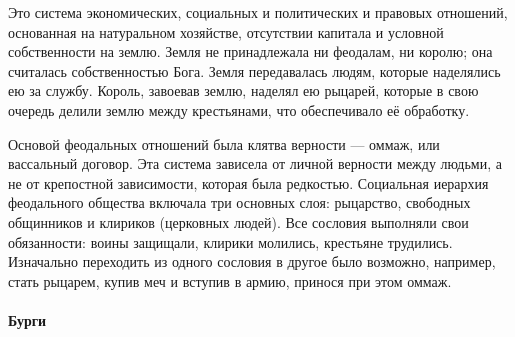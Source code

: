 Это система экономических, социальных и политических и правовых отношений, основанная на натуральном хозяйстве, отсутствии капитала и условной собственности на землю. Земля не принадлежала ни феодалам, ни королю; она считалась собственностью Бога. Земля передавалась людям, которые наделялись ею за службу. Король, завоевав землю, наделял ею рыцарей, которые в свою очередь делили землю между крестьянами, что обеспечивало её обработку.

Основой феодальных отношений была клятва верности --- оммаж, или вассальный договор. Эта система зависела от личной верности между людьми, а не от крепостной зависимости, которая была редкостью. Социальная иерархия феодального общества включала три основных слоя: рыцарство, свободных общинников и клириков (церковных людей). Все сословия выполняли свои обязанности: воины защищали, клирики молились, крестьяне трудились. Изначально переходить из одного сословия в другое было возможно, например, стать рыцарем, купив меч и вступив в армию, принося при этом оммаж.

\paragraph{Бурги} 

